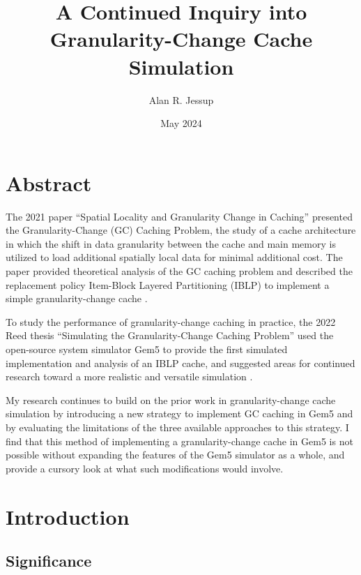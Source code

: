 \documentclass[12pt,twoside]{reedthesis}
\title{A Continued Inquiry into Granularity-Change Cache Simulation}
\author{Alan R. Jessup}
\date{May 2024}
\begin{document}
\maketitle
\frontmatter %
\pagestyle{empty}

\tableofcontents

\chapter*{Abstract}

The 2021 paper ``Spatial Locality and Granularity Change in Caching'' presented the Granularity-Change (GC) Caching Problem, the study of a cache architecture in which the shift in data granularity between the cache and main memory is utilized to load additional spatially local data for minimal additional cost. The paper provided theoretical analysis of the GC caching problem and described the replacement policy Item-Block Layered Partitioning (IBLP) to implement a simple granularity-change cache \cite{beckmann}.

To study the performance of granularity-change caching in practice, the 2022 Reed thesis ``Simulating the Granularity-Change Caching Problem'' used the open-source system simulator Gem5 to provide the first simulated implementation and analysis of an IBLP cache, and suggested areas for continued research toward a more realistic and versatile simulation \cite{curtis}.

My research continues to build on the prior work in granularity-change cache simulation by introducing a new strategy to implement GC caching in Gem5 and by evaluating the limitations of the three available approaches to this strategy. I find that this method of implementing a granularity-change cache in Gem5 is not possible without expanding the features of the Gem5 simulator as a whole, and provide a cursory look at what such modifications would involve.

\mainmatter
\pagestyle{fancyplain}

\chapter{Introduction}

\section{Significance}
\end{document}
